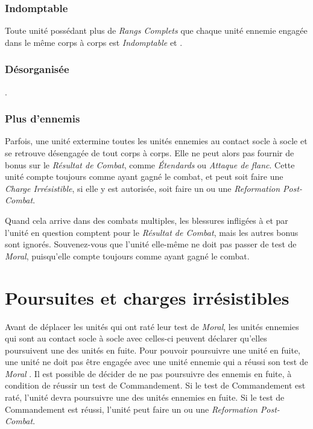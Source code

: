 \subsubsection*{Indomptable}

Toute unité possédant plus de \emph{Rangs Complets} que chaque unité ennemie engagée dans le même corps à corps est \emph{Indomptable} et .

\subsubsection*{Désorganisée}

.

\subsubsection*{Plus d'ennemis}
\label{cac/plus_ennemis}
Parfois, une unité extermine toutes les unités ennemies au contact socle à socle et se retrouve désengagée de tout corps à corps. Elle ne peut alors pas fournir de bonus sur le \emph{Résultat de Combat}, comme \emph{Étendards} ou \emph{Attaque de flanc}. Cette unité compte toujours comme ayant gagné le combat, et peut soit faire une \emph{Charge Irrésistible}, si elle y est autorisée, soit faire un  ou une \emph{Reformation Post-Combat}.

Quand cela arrive dans des combats multiples, les blessures infligées à et par l'unité en question comptent pour le \emph{Résultat de Combat}, mais les autres bonus sont ignorés. Souvenez-vous que l'unité elle-même ne doit pas passer de test de \emph{Moral}, puisqu'elle compte toujours comme ayant gagné le combat.

\section{Poursuites et charges irrésistibles}

Avant de déplacer les unités qui ont raté leur test de \emph{Moral}, les unités ennemies qui sont au contact socle à socle avec celles-ci peuvent déclarer qu'elles poursuivent une des unités en fuite. Pour pouvoir poursuivre une unité en fuite, une unité ne doit pas être engagée avec une unité ennemie qui a réussi son test de \emph{Moral} . Il est possible de décider de ne pas poursuivre des ennemis en fuite, à condition de réussir un test de Commandement. Si le test de Commandement est raté, l'unité devra poursuivre une des unités ennemies en fuite. Si le test de Commandement est réussi, l'unité peut faire un  ou une \emph{Reformation Post-Combat}. 

